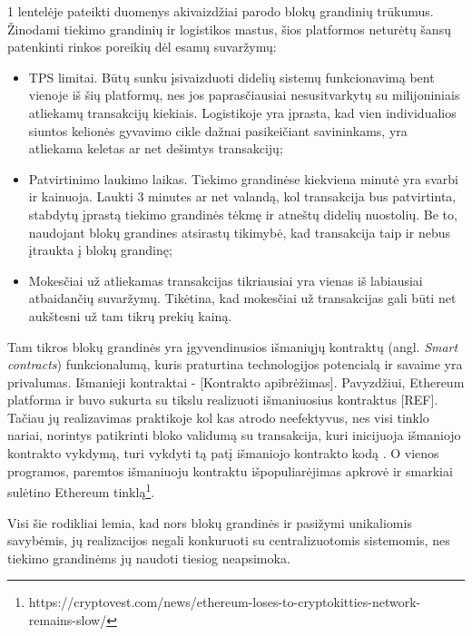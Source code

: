1 lentelėje pateikti duomenys akivaizdžiai parodo blokų grandinių trūkumus. Žinodami tiekimo grandinių ir logistikos mastus, šios platformos neturėtų šansų patenkinti rinkos poreikių dėl esamų suvaržymų: 
\begin{itemize}
    \item TPS limitai. Būtų sunku įsivaizduoti didelių sistemų funkcionavimą bent vienoje iš šių platformų, nes jos paprasčiausiai nesusitvarkytų su milijoniniais atliekamų transakcijų kiekiais. Logistikoje yra įprasta, kad vien individualios siuntos kelionės gyvavimo cikle dažnai pasikeičiant savininkams, yra atliekama keletas ar net dešimtys transakcijų;
    \item Patvirtinimo laukimo laikas. Tiekimo grandinėse kiekviena minutė yra svarbi ir kainuoja. Laukti 3 minutes ar net valandą, kol transakcija bus patvirtinta, stabdytų įprastą tiekimo grandinės tėkmę ir atneštų didelių nuostolių. Be to, naudojant blokų grandines atsirastų tikimybė, kad transakcija taip ir nebus įtraukta į blokų grandinę;
    \item Mokesčiai už atliekamas transakcijas tikriausiai yra vienas iš labiausiai atbaidančių suvaržymų. Tikėtina, kad mokesčiai už transakcijas gali būti net aukštesni už tam tikrų prekių kainą.
\end{itemize} 

Tam tikros blokų grandinės yra įgyvendinusios išmaniųjų kontraktų (angl. \textit{Smart contracts}) funkcionalumą, kuris praturtina technologijos potencialą ir savaime yra privalumas. Išmanieji kontraktai - [Kontrakto apibrėžimas]. Pavyzdžiui, Ethereum platforma ir buvo sukurta su tikslu realizuoti išmaniuosius kontraktus [REF]. Tačiau jų realizavimas praktikoje kol kas atrodo neefektyvus, nes visi tinklo nariai, norintys patikrinti bloko validumą su transakcija, kuri inicijuoja išmaniojo kontrakto vykdymą, turi vykdyti tą patį išmaniojo kontrakto kodą \cite{buterin2013ethereum}. O vienos programos, paremtos išmaniuoju kontraktu išpopuliarėjimas apkrovė ir smarkiai sulėtino Ethereum tinklą\footnote{https://cryptovest.com/news/ethereum-loses-to-cryptokitties-network-remains-slow/}.

Visi šie rodikliai lemia, kad nors blokų grandinės ir pasižymi unikaliomis savybėmis, jų realizacijos negali konkuruoti su centralizuotomis sistemomis, nes tiekimo grandinėms jų naudoti tiesiog neapsimoka. 




